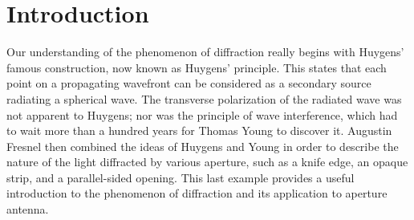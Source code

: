\chapter{Introduction}

Our understanding of the phenomenon of diffraction really begins with Huygens' famous construction, now known as Huygens' principle. This states that each point on a propagating wavefront can be considered as a secondary source radiating a spherical wave. The transverse polarization of the radiated wave was not apparent to Huygens; nor was the principle of wave interference, which had to wait more than a hundred years for Thomas Young to discover it. Augustin Fresnel then combined the ideas of Huygens and Young in order to describe the nature of the light diffracted by various aperture, such as a knife edge, an opaque strip, and a parallel-sided opening. This last example provides a useful introduction to the phenomenon of diffraction and its application to aperture antenna.

